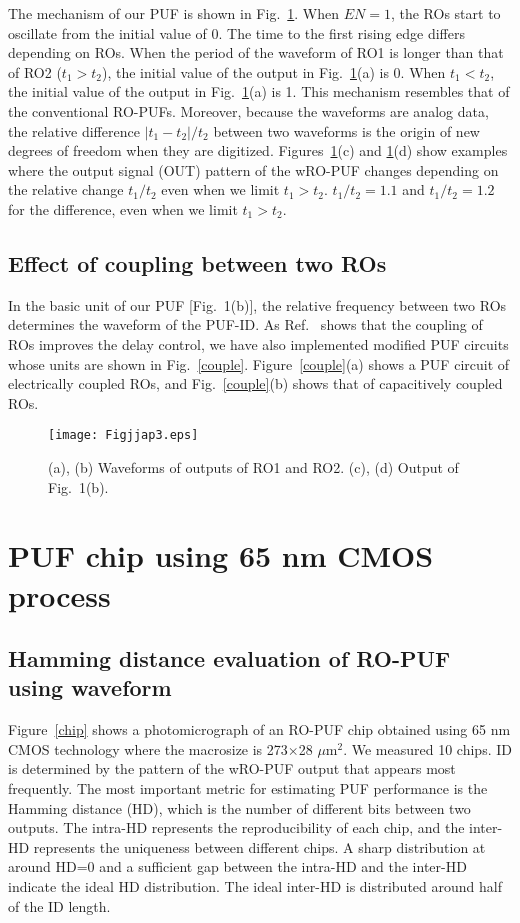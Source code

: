 \documentclass[%
reprint, amsmath,amssymb,%
pra,
]{revtex4-1}
\begin{document}
The mechanism of our PUF is shown in Fig.~\ref{waveform}. 
When $EN=1$, the ROs start to oscillate from the initial value of 0. 
The time to the first rising edge differs depending on ROs. 
When the period of the waveform of RO1 is longer than that of RO2 ($t_1>t_2$), 
the initial value of the output in Fig.~\ref{waveform}(a) is 0. 
When $t_1<t_2$, the initial value of the output in Fig.~\ref{waveform}(a) is 1. 
This mechanism resembles that of the conventional RO-PUFs. 
Moreover, because the waveforms are analog data, 
the relative difference $|t_1-t_2|/ t_2$ between two waveforms is the origin of new degrees of freedom 
when they are digitized. Figures~\ref{waveform}(c) and \ref{waveform}(d) show examples where the output signal (OUT) pattern 
of the wRO-PUF changes depending on the relative change $t_1/t_2$ even when we limit $t_1>t_2$. 
$t_1/t_2=1.1$ and $t_1/t_2=1.2$ for the difference, even when we limit $t_1>t_2$.
   
\subsection{Effect of coupling between two ROs}
 In the basic unit of our PUF [Fig.~1(b)], the relative frequency between two ROs determines the waveform of the PUF-ID. 
As Ref.~\cite{Maneatis} shows that the coupling of ROs improves the delay control, 
we have also implemented modified PUF circuits whose units are shown in Fig.~\ref{couple}. 
Figure~\ref{couple}(a) shows a PUF circuit of electrically coupled ROs, 
and Fig.~\ref{couple}(b) shows that of capacitively coupled ROs. 

\begin{figure}
\begin{center}
\texttt{[image: Figjjap3.eps]}
\end{center}
\caption{(a), (b) Waveforms of outputs of RO1 and RO2. (c), (d) Output of Fig.~1(b).}
\label{waveform}
\end{figure}

\section{PUF chip using 65 nm CMOS process}
\subsection{Hamming distance evaluation of RO-PUF using waveform}
Figure~\ref{chip} shows a photomicrograph of an RO-PUF chip obtained using 65 nm CMOS technology where the macrosize is 273$\times$28 $\mu$m${}^2$. 
We measured 10 chips. ID is determined by the pattern of the wRO-PUF output that appears most frequently. 
The most important metric for estimating PUF performance is the Hamming distance (HD), 
which is the number of different bits between two outputs. 
The intra-HD represents the reproducibility of each chip, and the 
inter-HD represents the uniqueness between different chips.
A sharp distribution at around HD=0 and a sufficient gap between the intra-HD 
and the inter-HD indicate the ideal HD distribution. 
The ideal inter-HD is distributed around half of the ID length. 
\end{document}
